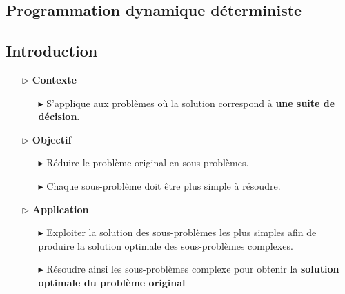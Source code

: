 \documentclass{report}
\begin{document}
\begin{multicols*}{2}
\newpage

\chapter{Programmation dynamique déterministe}
\section{Introduction}

\begin{itemize}
    \item [$\rhd$ ]\textbf{Contexte}   
    \begin{itemize}
        \item [$\blacktriangleright$ ] S'applique aux problèmes où la 
            solution correspond à \textbf{une suite de décision}. 
    \end{itemize}
    \item [$\rhd$ ] \textbf{Objectif}  
        \begin{itemize}
            \item [$\blacktriangleright$ ] Réduire le problème original en sous-problèmes.
            \item [$\blacktriangleright$ ] Chaque sous-problème doit être plus simple à résoudre.  
        \end{itemize}
    \item [$\rhd$ ] \textbf{Application }   
        \begin{itemize}
            \item [$\blacktriangleright$ ] Exploiter la solution des sous-problèmes les plus 
                simples afin de produire la solution optimale des sous-problèmes complexes. 
            \item [$\blacktriangleright$ ] Résoudre ainsi les sous-problèmes complexe pour obtenir  
                la \textbf{solution optimale du problème original}  
        \end{itemize}
\end{itemize}

\end{multicols*}
\end{document}
